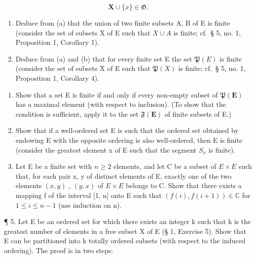 \[
\mathbf {X} \cup \{x \} \in \mathfrak {G}.
\]

\begin{enumerate}
\def\labelenumi{(\alph{enumi})}
\setcounter{enumi}{1}
\item
  Deduce from (a) that the union of two finite subsets A, B of E is finite (consider the set of subsets X of E such that \(X \cup A\) is finite; cf.~§ 5, no. 1, Proposition 1, Corollary 1).
\item
  Deduce from (a) and (b) that for every finite set E the set \(\mathfrak{P}(E)\) is finite (consider the set of subsets X of E such that \(\mathfrak{P}(X)\) is finite; cf.~§ 5, no. 1, Proposition 1, Corollary 4).
\end{enumerate}

\begin{enumerate}
\def\labelenumi{\arabic{enumi}.}
\setcounter{enumi}{1}
\item
  Show that a set E is finite if and only if every non-empty subset of \(\mathfrak{P}(\mathbf{E})\) has a maximal element (with respect to inclusion). (To show that the condition is sufficient, apply it to the set \(\mathfrak{F}(\mathbf{E})\) of finite subsets of E.)
\item
  Show that if a well-ordered set E is such that the ordered set obtained by endowing E with the opposite ordering is also well-ordered, then E is finite (consider the greatest element x of E such that the segment \(S_{x}\) is finite).
\item
  Let E be a finite set with \(n \geqslant 2\) elements, and let C be a subset of \(E \times E\) such that, for each pair x, y of distinct elements of E, exactly one of the two elements \((x, y)\) , \((y, x)\) of \(E \times E\) belongs to C. Show that there exists a mapping f of the interval {[}1, n{]} onto E such that \((f(i), f(i+1)) \in \mathbb{C}\) for \(1 \leqslant i \leqslant n - 1\) (use induction on n).
\end{enumerate}

¶ 5. Let E be an ordered set for which there exists an integer k such that k is the greatest number of elements in a free subset X of E (§ 1, Exercise 5). Show that E can be partitioned into k totally ordered subsets (with respect to the induced ordering). The proof is in two steps:

